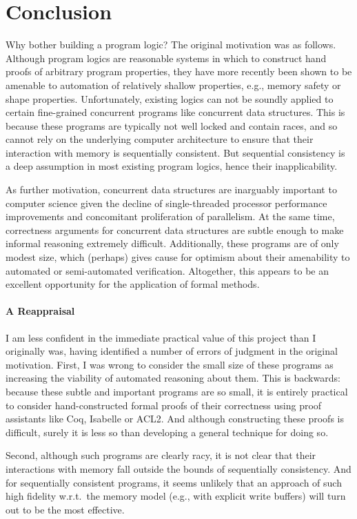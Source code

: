\documentclass[11pt]{article}
\begin{document}
\section{Conclusion}
 Why bother building a program logic? The original motivation was as follows. Although program logics are reasonable systems in which to construct hand proofs of arbitrary program properties, they have more recently been shown to be amenable to automation of relatively shallow properties, e.g., memory safety or shape properties. Unfortunately, existing logics can not be soundly applied to certain fine-grained concurrent programs like concurrent data structures. This is because these programs are typically not well locked and contain races, and so cannot rely on the underlying computer architecture to ensure that their interaction with memory is sequentially consistent. But sequential consistency is a deep assumption in most existing program logics, hence their inapplicability.

As further motivation, concurrent data structures are inarguably important to computer science given the decline of single-threaded processor performance improvements and concomitant proliferation of parallelism. At the same time, correctness arguments for concurrent data structures are subtle enough to make informal reasoning extremely difficult. Additionally, these programs are of only modest size, which (perhaps) gives cause for optimism about their amenability to automated or semi-automated verification. Altogether, this appears to be an excellent opportunity for the application of formal methods. 

\paragraph{A Reappraisal}

I am less confident in the immediate practical value of this project than I originally was, having identified a number of errors of judgment in the original motivation. First, I was wrong to consider the small size of these programs as increasing the viability of automated reasoning about them. This is backwards: because these subtle and important programs are so small, it is entirely practical to consider hand-constructed formal proofs of their correctness using proof assistants like Coq, Isabelle or ACL2. And although constructing these proofs is difficult, surely it is less so than developing a general technique for doing so. 

Second, although such programs are clearly racy, it is not clear that their interactions with memory fall outside the bounds of sequentially consistency. And for sequentially consistent programs, it seems unlikely that an approach of such high fidelity w.r.t.~the memory model (e.g., with explicit write buffers) will turn out to be the most effective. 
\end{document}
